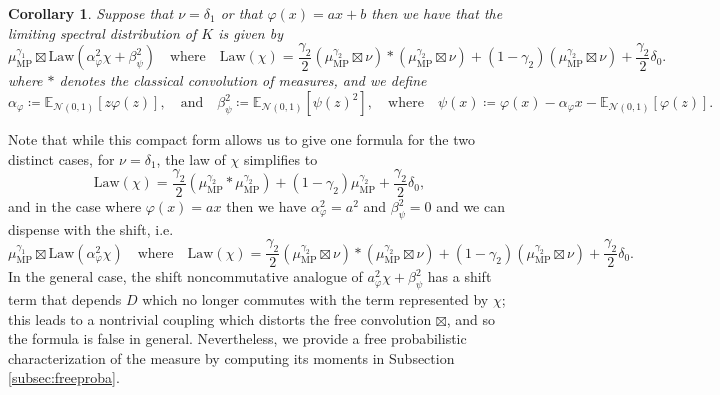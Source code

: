 \documentclass[letterpaper, 10pt, dvipsnames]{article}
\numberwithin{equation}{section}
\renewcommand{\phi}{\varphi}
\newcommand{\E}{\mathds{E}}
\newtheorem{corollary}[ccounter]{Corollary}
\theoremstyle{definition}
\begin{document}
\begin{corollary}\label{cor:main}
 Suppose that $\nu=\delta_1$ or that $\varphi(x)= a x+b$ then we have that the limiting spectral distribution of $K$ is given by 
 \[
  \mu_{\mathrm{MP}}^{\gamma_1}
  \boxtimes
  \mathrm{Law}\left( \alpha_\phi^2 \chi + \beta_\psi^2\right)
  \quad\text{where}\quad
  \mathrm{Law}(\chi) = \frac{\gamma_2}{2} (\mu_{\mathrm{MP}}^{\gamma_2} \boxtimes \nu) * (\mu_{\mathrm{MP}}^{\gamma_2} \boxtimes \nu) + (1-\gamma_2) (\mu_{\mathrm{MP}}^{\gamma_2} \boxtimes \nu) + \frac{\gamma_2}{2} \delta_0.
 \]
 where $\ast$ denotes the classical convolution of measures, and we define 
 \[
 \alpha_\phi \coloneqq \E_{\mathcal{N}(0,1)}\left[z\varphi(z)\right],
 \quad\text{and}\quad
 \beta_\psi^2 \coloneqq \E_{\mathcal{N}(0,1)}\left[\psi(z)^2\right],
 \quad \text{where} \quad \psi(x) \coloneqq \varphi(x) - \alpha_\phi x - \mathbb{E}_{\mathcal{N}(0,1)}\left[\varphi(z)\right].
 \]
\end{corollary}
Note that while this compact form allows us to give one formula for the two distinct cases, for $\nu=\delta_1$, the law of $\chi$ simplifies to  
\[
  \mathrm{Law}(\chi) = \frac{\gamma_2}{2} (\mu_{\mathrm{MP}}^{\gamma_2} * \mu_{\mathrm{MP}}^{\gamma_2}) + (1-\gamma_2) \mu_{\mathrm{MP}}^{\gamma_2} + \frac{\gamma_2}{2} \delta_0,
\]
and in the case where $\varphi(x)=a x$ then we have $\alpha_\phi^2=a^2$ and $\beta_\psi^2=0$ and we can dispense with the shift, i.e.\ 
\[
  \mu_{\mathrm{MP}}^{\gamma_1}
  \boxtimes
  \mathrm{Law}\left( \alpha_\phi^2 \chi\right)
  \quad\text{where}\quad
  \mathrm{Law}(\chi) = \frac{\gamma_2}{2} (\mu_{\mathrm{MP}}^{\gamma_2} \boxtimes \nu) * (\mu_{\mathrm{MP}}^{\gamma_2} \boxtimes \nu) + (1-\gamma_2) (\mu_{\mathrm{MP}}^{\gamma_2} \boxtimes \nu) + \frac{\gamma_2}{2} \delta_0.
\]
In the general case, the shift noncommutative analogue of $a_\phi^2 \chi + \beta_\psi^2$ has a shift term that depends $D$ which no longer commutes with the term represented by $\chi$; this leads to a nontrivial coupling which distorts the free convolution $\boxtimes$, and so the formula is false in general. Nevertheless, we provide a free probabilistic characterization of the measure by computing its moments in Subsection \ref{subsec:freeproba}.
\end{document}
